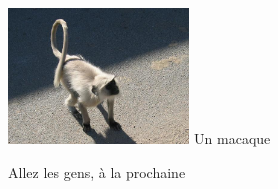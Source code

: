\begin{multicols}{2}
\hspace*{-0.65cm}
\includegraphics[width=4.8cm]{articles/La-vie-en-inde/singe.jpg}
Un macaque

Allez les gens, à la prochaine

\end{multicols}
